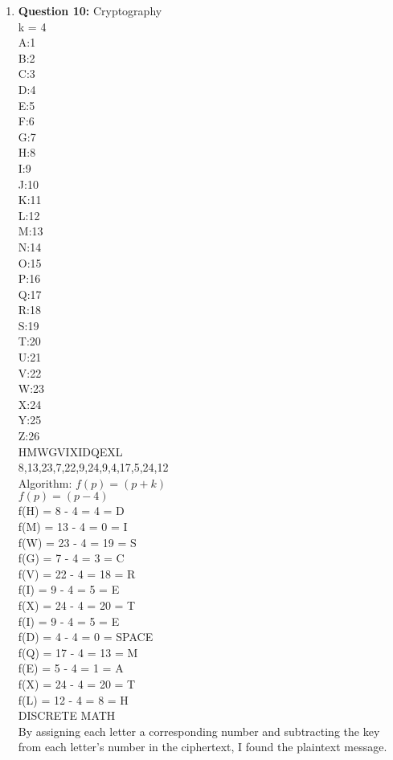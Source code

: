 \documentclass[11pt]{article}
\begin{document}
\begin{enumerate}
\begin{enumerate}[label=(\alph*)]
\end{enumerate}
\item
\textbf{Question 10:} Cryptography \\
k = 4\\
A:1 \\
B:2 \\
C:3 \\
D:4 \\
E:5 \\
F:6 \\
G:7 \\
H:8 \\
I:9 \\
J:10 \\
K:11 \\
L:12 \\
M:13 \\
N:14 \\
O:15 \\
P:16 \\
Q:17 \\
R:18 \\
S:19 \\
T:20 \\
U:21 \\
V:22 \\
W:23 \\
X:24 \\
Y:25 \\
Z:26 \\
HMWGVIXIDQEXL \\
8,13,23,7,22,9,24,9,4,17,5,24,12\\
Algorithm: $f(p) = (p+k)$ \\
$f(p) = (p-4)$\\
f(H) = 8 - 4 = 4 = D \\
f(M) = 13 - 4 = 0 = I \\
f(W) = 23 - 4 = 19 = S \\
f(G) = 7 - 4 = 3 = C \\
f(V) = 22 - 4 = 18 = R \\
f(I) = 9 - 4 = 5 = E \\
f(X) = 24 - 4 = 20 = T \\
f(I) = 9 - 4 = 5 = E \\
f(D) = 4 - 4 = 0 = SPACE \\
f(Q) = 17 - 4 = 13 = M \\
f(E) = 5 - 4 = 1 = A \\
f(X) = 24 - 4 = 20 = T \\
f(L) = 12 - 4 = 8 = H \\
DISCRETE MATH \\
By assigning each letter a corresponding number and subtracting the key from each letter's number in the ciphertext, I found the plaintext message.
\end{enumerate}
\end{document}
